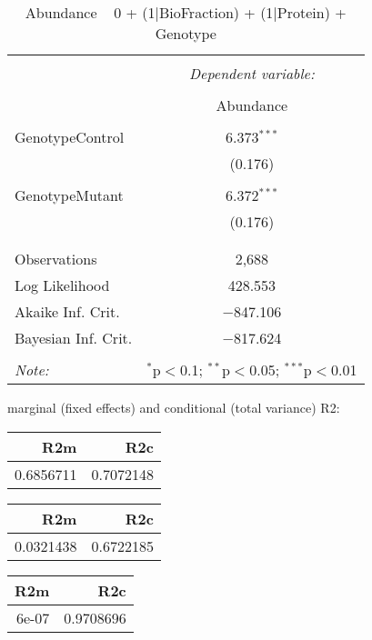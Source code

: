 \documentclass[11pt]{report}
\begin{document}
\begin{table}[!htbp] \centering 
  \caption{Abundance ~ 0 + (1|BioFraction) + (1|Protein) + Genotype} 
  \label{} 
\begin{tabular}{@{\extracolsep{5pt}}lc} 
\\[-1.8ex]\hline 
\hline \\[-1.8ex] 
 & \multicolumn{1}{c}{\textit{Dependent variable:}} \\ 
\cline{2-2} 
\\[-1.8ex] & Abundance \\ 
\hline \\[-1.8ex] 
 GenotypeControl & 6.373$^{***}$ \\ 
  & (0.176) \\ 
  & \\ 
 GenotypeMutant & 6.372$^{***}$ \\ 
  & (0.176) \\ 
  & \\ 
\hline \\[-1.8ex] 
Observations & 2,688 \\ 
Log Likelihood & 428.553 \\ 
Akaike Inf. Crit. & $-$847.106 \\ 
Bayesian Inf. Crit. & $-$817.624 \\ 
\hline 
\hline \\[-1.8ex] 
\textit{Note:}  & \multicolumn{1}{r}{$^{*}$p$<$0.1; $^{**}$p$<$0.05; $^{***}$p$<$0.01} \\ 
\end{tabular} 
\end{table} 
marginal (fixed effects) and conditional (total variance) R2:

\begin{tabular}{r|r}
\hline
R2m & R2c\\
\hline
0.6856711 & 0.7072148\\
\hline
\end{tabular}

\begin{tabular}{r|r}
\hline
R2m & R2c\\
\hline
0.0321438 & 0.6722185\\
\hline
\end{tabular}

\begin{tabular}{r|r}
\hline
R2m & R2c\\
\hline
6e-07 & 0.9708696\\
\hline
\end{tabular}
\end{document}

